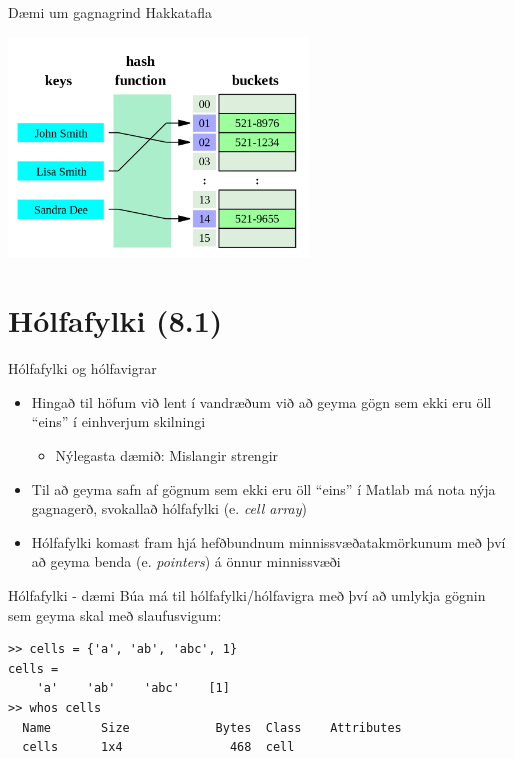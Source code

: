 \documentclass[handout]{beamer}
\begin{document}
\begin{frame}{Dæmi um gagnagrind}
Hakkatafla
\begin{center}
\includegraphics[width=0.6\textwidth]{../Pics/hash-table}
\end{center}
\end{frame}

\section{Hólfafylki (8.1)}

\begin{frame}{Hólfafylki og hólfavigrar}
\begin{itemize}
 \item Hingað til höfum við lent í vandræðum við að geyma gögn sem ekki eru öll ``eins'' í einhverjum skilningi
 \begin{itemize}
  \item Nýlegasta dæmið: Mislangir strengir
 \end{itemize}
 \item Til að geyma safn af gögnum sem ekki eru öll ``eins'' í Matlab má nota nýja gagnagerð, svokallað hólfafylki (e. \emph{cell array})
 \item Hólfafylki komast fram hjá hefðbundnum minnissvæðatakmörkunum með því að geyma benda (e. \emph{pointers}) á önnur minnissvæði
\end{itemize}
\end{frame}

\begin{frame}[fragile]{Hólfafylki - dæmi}
Búa má til hólfafylki/hólfavigra með því að umlykja gögnin sem geyma skal með slaufusvigum:

\begin{verbatim}
>> cells = {'a', 'ab', 'abc', 1}
cells = 
    'a'    'ab'    'abc'    [1]
>> whos cells
  Name       Size            Bytes  Class    Attributes
  cells      1x4               468  cell
\end{verbatim}
\end{frame}
\end{document}
